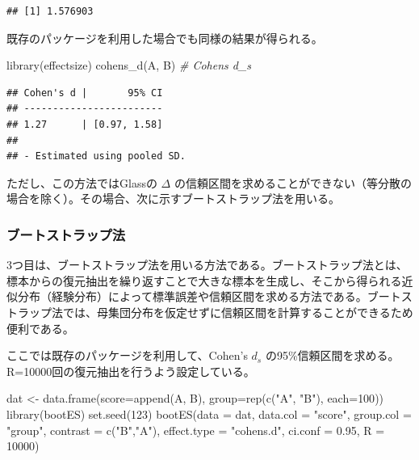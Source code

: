 \documentclass[
  ja=standard, xelatex, base=12pt]{bxjsreport}
\newenvironment{Shaded}{\begin{snugshade}}{\end{snugshade}}
\newcommand{\AttributeTok}[1]{\textcolor[rgb]{0.77,0.63,0.00}{#1}}
\newcommand{\CommentTok}[1]{\textcolor[rgb]{0.56,0.35,0.01}{\textit{#1}}}
\newcommand{\DecValTok}[1]{\textcolor[rgb]{0.00,0.00,0.81}{#1}}
\newcommand{\FloatTok}[1]{\textcolor[rgb]{0.00,0.00,0.81}{#1}}
\newcommand{\FunctionTok}[1]{\textcolor[rgb]{0.00,0.00,0.00}{#1}}
\newcommand{\NormalTok}[1]{#1}
\newcommand{\OtherTok}[1]{\textcolor[rgb]{0.56,0.35,0.01}{#1}}
\newcommand{\StringTok}[1]{\textcolor[rgb]{0.31,0.60,0.02}{#1}}
\begin{document}
\begin{verbatim}
## [1] 1.576903
\end{verbatim}

既存のパッケージを利用した場合でも同様の結果が得られる。

\begin{Shaded}
\begin{Highlighting}[]
\FunctionTok{library}\NormalTok{(effectsize)}
\FunctionTok{cohens\_d}\NormalTok{(A, B)  }\CommentTok{\# Cohen\textquotesingle{}s d\_s}
\end{Highlighting}
\end{Shaded}

\begin{verbatim}
## Cohen's d |       95% CI
## ------------------------
## 1.27      | [0.97, 1.58]
## 
## - Estimated using pooled SD.
\end{verbatim}

ただし、この方法ではGlassの \(\Delta\) の信頼区間を求めることができない（等分散の場合を除く）。その場合、次に示すブートストラップ法を用いる。

\hypertarget{ux30d6ux30fcux30c8ux30b9ux30c8ux30e9ux30c3ux30d7ux6cd5-1}{%
\subsubsection{ブートストラップ法}\label{ux30d6ux30fcux30c8ux30b9ux30c8ux30e9ux30c3ux30d7ux6cd5-1}}

3つ目は、ブートストラップ法を用いる方法である。ブートストラップ法とは、標本からの復元抽出を繰り返すことで大きな標本を生成し、そこから得られる近似分布（経験分布）によって標準誤差や信頼区間を求める方法である。ブートストラップ法では、母集団分布を仮定せずに信頼区間を計算することができるため便利である。

ここでは既存のパッケージを利用して、Cohen's \(d_s\) の95\%信頼区間を求める。R=10000回の復元抽出を行うよう設定している。

\begin{Shaded}
\begin{Highlighting}[]
\NormalTok{dat }\OtherTok{\textless{}{-}} \FunctionTok{data.frame}\NormalTok{(}\AttributeTok{score=}\FunctionTok{append}\NormalTok{(A, B), }\AttributeTok{group=}\FunctionTok{rep}\NormalTok{(}\FunctionTok{c}\NormalTok{(}\StringTok{"A"}\NormalTok{, }\StringTok{"B"}\NormalTok{), }\AttributeTok{each=}\DecValTok{100}\NormalTok{))}
\FunctionTok{library}\NormalTok{(bootES)}
\FunctionTok{set.seed}\NormalTok{(}\DecValTok{123}\NormalTok{)}
\FunctionTok{bootES}\NormalTok{(}\AttributeTok{data =}\NormalTok{ dat, }\AttributeTok{data.col =} \StringTok{"score"}\NormalTok{, }\AttributeTok{group.col =} \StringTok{"group"}\NormalTok{, }\AttributeTok{contrast =} \FunctionTok{c}\NormalTok{(}\StringTok{"B"}\NormalTok{,}\StringTok{"A"}\NormalTok{), }
       \AttributeTok{effect.type =} \StringTok{"cohens.d"}\NormalTok{, }\AttributeTok{ci.conf =} \FloatTok{0.95}\NormalTok{, }\AttributeTok{R =} \DecValTok{10000}\NormalTok{)}
\end{Highlighting}
\end{Shaded}
\end{document}

